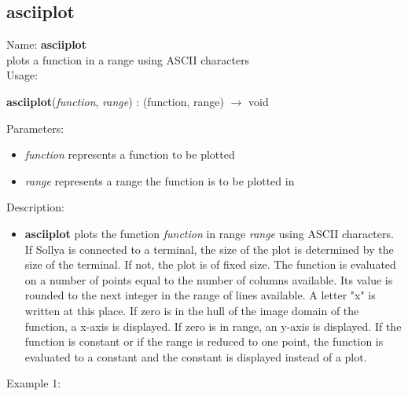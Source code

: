 \subsection{asciiplot}
\label{labasciiplot}
\noindent Name: \textbf{asciiplot}\\
plots a function in a range using ASCII characters\\

\noindent Usage: 
\begin{center}
\textbf{asciiplot}(\emph{function}, \emph{range}) : (\textsf{function}, \textsf{range}) $\rightarrow$ \textsf{void}\\
\end{center}
Parameters: 
\begin{itemize}
\item \emph{function} represents a function to be plotted
\item \emph{range} represents a range the function is to be plotted in 
\end{itemize}
\noindent Description: \begin{itemize}

\item \textbf{asciiplot} plots the function \emph{function} in range \emph{range}
   using ASCII characters.  If Sollya is connected to a terminal, the
   size of the plot is determined by the size of the terminal. If not,
   the plot is of fixed size.  The function is evaluated on a number of
   points equal to the number of columns available. Its value is rounded
   to the next integer in the range of lines available. A letter "x" is
   written at this place. If zero is in the hull of the image domain of
   the function, a x-axis is displayed. If zero is in range, an y-axis is
   displayed.  If the function is constant or if the range is reduced to
   one point, the function is evaluated to a constant and the constant is
   displayed instead of a plot.
\end{itemize}
\noindent Example 1: 

